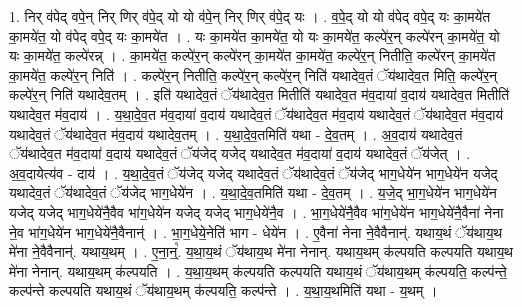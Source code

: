 \documentclass[17pt]{extarticle}
\begin{document}
1. निर् व॑पेद् वपे॒न् निर् णिर् व॑पे॒द् यो यो व॑पे॒न् निर् णिर् व॑पे॒द् यः । . व॒पे॒द् यो यो व॑पेद् वपे॒द् यः का॒मये॑त का॒मये॑त॒ यो व॑पेद् वपे॒द् यः का॒मये॑त । . यः का॒मये॑त का॒मये॑त॒ यो यः का॒मये॑त॒ कल्पे॑र॒न् कल्पे॑रन् का॒मये॑त॒ यो यः का॒मये॑त॒ कल्पे॑रन्न् । . का॒मये॑त॒ कल्पे॑र॒न् कल्पे॑रन् का॒मये॑त का॒मये॑त॒ कल्पे॑र॒न् नितीति॒ कल्पे॑रन् का॒मये॑त का॒मये॑त॒ कल्पे॑र॒न् निति॑ । . कल्पे॑र॒न् नितीति॒ कल्पे॑र॒न् कल्पे॑र॒न् निति॑ यथादेव॒तं ॅय॑थादेव॒त मिति॒ कल्पे॑र॒न् कल्पे॑र॒न् निति॑ यथादेव॒तम् । . इति॑ यथादेव॒तं ॅय॑थादेव॒त मितीति॑ यथादेव॒त म॑व॒दाया॑ व॒दाय॑ यथादेव॒त मितीति॑ यथादेव॒त म॑व॒दाय॑ । . य॒था॒दे॒व॒त म॑व॒दाया॑ व॒दाय॑ यथादेव॒तं ॅय॑थादेव॒त म॑व॒दाय॑ यथादेव॒तं ॅय॑थादेव॒त म॑व॒दाय॑ यथादेव॒तं ॅय॑थादेव॒त म॑व॒दाय॑ यथादेव॒तम् । . य॒था॒दे॒व॒तमिति॑ यथा - दे॒व॒तम् । . अ॒व॒दाय॑ यथादेव॒तं ॅय॑थादेव॒त म॑व॒दाया॑ व॒दाय॑ यथादेव॒तं ॅय॑जेद् यजेद् यथादेव॒त म॑व॒दाया॑ व॒दाय॑ यथादेव॒तं ॅय॑जेत् । . अ॒व॒दायेत्य॑व - दाय॑ । . य॒था॒दे॒व॒तं ॅय॑जेद् यजेद् यथादेव॒तं ॅय॑थादेव॒तं ॅय॑जेद् भाग॒धेये॑न भाग॒धेये॑न यजेद् यथादेव॒तं ॅय॑थादेव॒तं ॅय॑जेद् भाग॒धेये॑न । . य॒था॒दे॒व॒तमिति॑ यथा - दे॒व॒तम् । . य॒जे॒द् भा॒ग॒धेये॑न भाग॒धेये॑न यजेद् यजेद् भाग॒धेये॑नै॒वैव भा॑ग॒धेये॑न यजेद् यजेद् भाग॒धेये॑नै॒व । . भा॒ग॒धेये॑नै॒वैव भा॑ग॒धेये॑न भाग॒धेये॑नै॒वैना॑ नेना ने॒व भा॑ग॒धेये॑न भाग॒धेये॑नै॒वैनान्॑ । . भा॒ग॒धेये॒नेति॑ भाग - धेये॑न । . ए॒वैना॑ नेना ने॒वैवैनान्॑. यथाय॒थं ॅय॑थाय॒थ मे॑ना ने॒वैवैनान्॑. यथाय॒थम् । . ए॒ना॒न्॒꣡. य॒था॒य॒थं ॅय॑थाय॒थ मे॑ना नेनान्. यथाय॒थम् क॑ल्पयति कल्पयति यथाय॒थ मे॑ना नेनान्. यथाय॒थम् क॑ल्पयति । . य॒था॒य॒थम् क॑ल्पयति कल्पयति यथाय॒थं ॅय॑थाय॒थम् क॑ल्पयति॒ कल्प॑न्ते॒ कल्प॑न्ते कल्पयति यथाय॒थं ॅय॑थाय॒थम् क॑ल्पयति॒ कल्प॑न्ते । . य॒था॒य॒थमिति॑ यथा - य॒थम् । \newline
\end{document}
